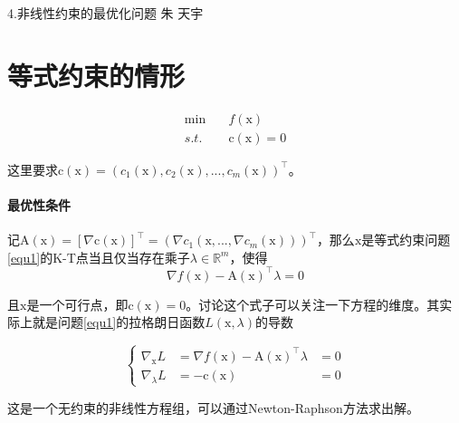 \documentclass[a4paper]{D:/repositories/MyDGP/latex/PaperReadingLog}
\begin{document}
\PaperInfo
{4.非线性约束的最优化问题}
{朱}
{天宇}
{}



\section{等式约束的情形}
\begin{equation}
    \label{equ1}
    \begin{aligned}
        \min\quad& f(\mathrm{x})\\
        s.t.\quad& \mathrm{c}(\mathrm{x})=0
    \end{aligned}        
\end{equation}

这里要求$\mathrm{c}(\mathrm{x})=(c_1(\mathrm{x}),c_2(\mathrm{x}),...,c_m(\mathrm{x}))^\top$。

\paragraph{最优性条件}
记$\mathrm{A}(\mathrm{x})=[\nabla\mathrm{c}(\mathrm{x})]^\top=(\nabla c_1(\mathrm{x},...,\nabla c_m(\mathrm{x})))^\top$，那么$\mathrm{x}$是等式约束问题\ref{equ1}的K-T点当且仅当存在乘子$\lambda\in\mathbb{R}^m$，使得
$$
    \nabla f(\mathrm{x})-\mathrm{A}(\mathrm{x})^\top\lambda=0
$$

且$\mathrm{x}$是一个可行点，即$\mathrm{c}(\mathrm{x})=0$。讨论这个式子可以关注一下方程的维度。其实际上就是问题\ref{equ1}的拉格朗日函数$L(\mathrm{x},\lambda)$的导数

$$
\left\{
\begin{aligned}
    \nabla_\mathrm{x}L&=\nabla f(\mathrm{x})-\mathrm{A}(\mathrm{x})^\top \lambda&=0\\
    \nabla_\lambda L&=-\mathrm{c}(\mathrm{x})&=0
\end{aligned}
\right.
$$

 这是一个无约束的非线性方程组，可以通过Newton-Raphson方法求出解。
\end{document}
